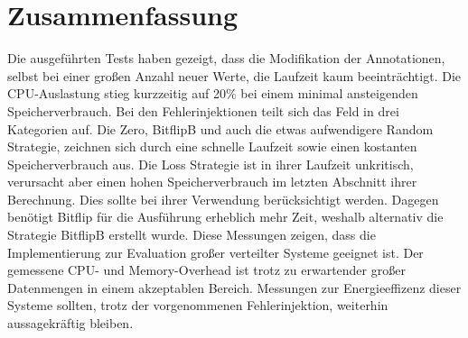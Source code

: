 \section{Zusammenfassung}
Die ausgef\"uhrten Tests haben gezeigt, dass die Modifikation der Annotationen, selbst bei einer gro\ss en Anzahl neuer Werte, die Laufzeit kaum beeintr\"achtigt. Die CPU-Auslastung stieg kurzzeitig auf 20\% bei einem minimal ansteigenden Speicherverbrauch. Bei den Fehlerinjektionen teilt sich das Feld in drei Kategorien auf. Die Zero, BitflipB und auch die etwas aufwendigere Random Strategie, zeichnen sich durch eine schnelle Laufzeit sowie einen kostanten Speicherverbrauch aus. Die Loss Strategie ist in ihrer Laufzeit unkritisch, verursacht aber einen hohen Speicherverbrauch im letzten Abschnitt ihrer Berechnung. Dies sollte bei ihrer Verwendung ber\"ucksichtigt werden. Dagegen benötigt Bitflip f\"ur die Ausf\"uhrung erheblich mehr Zeit, weshalb alternativ die Strategie BitflipB erstellt wurde. Diese Messungen zeigen, dass die Implementierung zur Evaluation großer verteilter Systeme geeignet ist. Der gemessene CPU- und Memory-Overhead ist trotz zu erwartender gro\ss er Datenmengen in einem akzeptablen Bereich. Messungen zur Energieeffizenz dieser Systeme sollten, trotz der vorgenommenen Fehlerinjektion, weiterhin aussagekräftig bleiben.